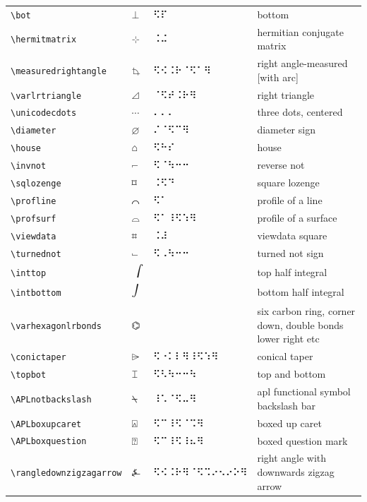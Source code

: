 \documentclass[oneside]{article}
\begin{document}
\begin{longtable}{llll}
\verb|\bot| & $\bot$ &  ⠫⠏  & {bottom} \\[2ex]
\verb|\hermitmatrix| & $\hermitmatrix$ &  ⠨⠬  & {hermitian conjugate matrix} \\[2ex]
\verb|\measuredrightangle| & $\measuredrightangle$ &  ⠫⠪⠨⠗⠈⠫⠁⠻  & {right angle-measured [with arc]} \\[2ex]
\verb|\varlrtriangle| & $\varlrtriangle$ &  ⠈⠫⠞⠨⠗⠻  & {right triangle} \\[2ex]
\verb|\unicodecdots| & $\unicodecdots$ &  ⠄⠄⠄  & {three dots, centered} \\[2ex]
\verb|\diameter| & $\diameter$ &  ⠌⠈⠫⠉⠻  & {diameter sign} \\[2ex]
\verb|\house| & $\house$ &  ⠫⠓⠎  & {house} \\[2ex]
\verb|\invnot| & $\invnot$ &  ⠫⠈⠳⠒⠒  & {reverse not} \\[2ex]
\verb|\sqlozenge| & $\sqlozenge$ &  ⠨⠫⠙  & {square lozenge} \\[2ex]
\verb|\profline| & $\profline$ &  ⠫⠁  & {profile of a line} \\[2ex]
\verb|\profsurf| & $\profsurf$ &  ⠫⠁⠸⠫⠱⠻  & {profile of a surface} \\[2ex]
\verb|\viewdata| & $\viewdata$ &  ⠨⠼  & {viewdata square} \\[2ex]
\verb|\turnednot| & $\turnednot$ &  ⠫⠠⠳⠒⠒  & {turned not sign} \\[2ex]
\verb|\inttop| & $\inttop$ &    & {top half integral} \\[2ex]
\verb|\intbottom| & $\intbottom$ &    & {bottom half integral} \\[2ex]
\verb|\varhexagonlrbonds| & $\varhexagonlrbonds$ &    & \begin{minipage}[t]{8cm}{six carbon ring, corner down, double bonds lower right etc}
\end{minipage}\\[4ex]
\verb|\conictaper| & $\conictaper$ &  ⠫⠐⠅⠇⠻⠸⠫⠱⠻  & {conical taper } \\[2ex]
\verb|\topbot| & $\topbot$ &  ⠫⠣⠳⠒⠒⠳  & {top and bottom} \\[2ex]
\verb|\APLnotbackslash| & $\APLnotbackslash$ &  ⠸⠡⠈⠫⠤⠻  & {apl functional symbol backslash bar} \\[2ex]
\verb|\APLboxupcaret| & $\APLboxupcaret$ &  ⠫⠉⠸⠫⠈⠩⠻  & {boxed up caret} \\[2ex]
\verb|\APLboxquestion| & $\APLboxquestion$ &  ⠫⠉⠸⠫⠸⠦⠻  & {boxed question mark} \\[2ex]
\verb|\rangledownzigzagarrow| & $\rangledownzigzagarrow$ &  ⠫⠪⠨⠗⠻⠈⠫⠩⠔⠢⠔⠕⠻  & {right angle with downwards zigzag arrow} \\[2ex]

\end{longtable}
\end{document}
